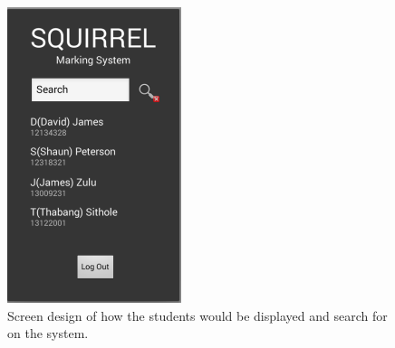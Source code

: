\documentclass[11pt,a4paper]{article}
\begin{document}
		\begin{figure}[h!]
		\centering
		\includegraphics[width=0.7\linewidth]{./mobile_searchForStudent}
		\caption{Screen design of how the students would be displayed and search for on the system.}
		\label{fig:mobile_searchForStudent}
		\end{figure}
\pagebreak	
\end{document}
